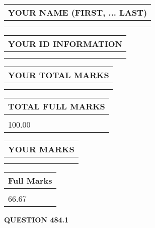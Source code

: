 \documentclass{ctexart}
\begin{document}
   
   
   
\newpage 
\setcounter{page}{ 
   484001 } 
   
   
   
   
\noindent\begin{tabular}{|l|}
\hline
YOUR NAME (FIRST, ... LAST)  \\
\hline
 \\ 
 \\ 
\hline
\end{tabular}
\hspace{0.05in} \begin{tabular}{|l|}
\hline
 YOUR   ID   INFORMATION  \\
\hline
 \\ 
 \\ 
\hline
\end{tabular}
   
   
\vspace{0.2in}\noindent\begin{tabular}{|l|}
\hline
YOUR TOTAL MARKS  \\
\hline
 \\ 
 \\ 
\hline
\end{tabular}
\hspace{0.05in} \begin{tabular}{|l|}
\hline
TOTAL FULL MARKS  \\
\hline
 \\ 
100.00 \\
\hline
\end{tabular}
   
   
 \vspace{0.2in}
 
 
 
 
   
   
  
\vspace{0.2in}
  
\noindent\begin{tabular}{|l|}
\hline
 YOUR MARKS  \\
\hline
 \\ 
 \\ 
\hline
\end{tabular}
\hspace{0.05in} \begin{tabular}{|l|}
\hline
 Full Marks  \\
\hline
 \\ 
66.67 \\
\hline
\end{tabular}
{\textbf{\Large{QUESTION
484.1 
}}}
  
\end{document}
